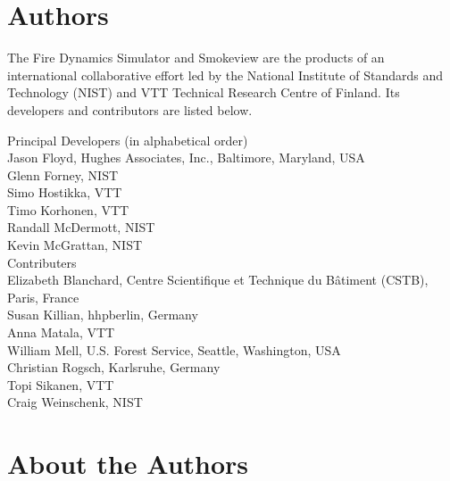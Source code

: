\chapter{Authors}

The Fire Dynamics Simulator and Smokeview are the products of an international collaborative effort led by
the National Institute of Standards and Technology (NIST) and VTT Technical Research Centre of Finland. Its developers and
contributors are listed below.

\vspace{0.5in}

\begin{flushleft}

Principal Developers (in alphabetical order) \\ [0.2in]

Jason Floyd, Hughes Associates, Inc., Baltimore, Maryland, USA \\
Glenn Forney, NIST \\
Simo Hostikka, VTT \\
Timo Korhonen, VTT  \\
Randall McDermott, NIST \\
Kevin McGrattan, NIST \\ [0.5in]

Contributers \\ [0.2in]

Elizabeth Blanchard, Centre Scientifique et Technique du B\^{a}timent (CSTB), Paris, France \\
Susan Killian, hhpberlin, Germany \\
Anna Matala, VTT \\
William Mell, U.S. Forest Service, Seattle, Washington, USA \\
Christian Rogsch, Karlsruhe, Germany \\
Topi Sikanen, VTT \\
Craig Weinschenk, NIST

\end{flushleft}


\chapter{About the Authors}

